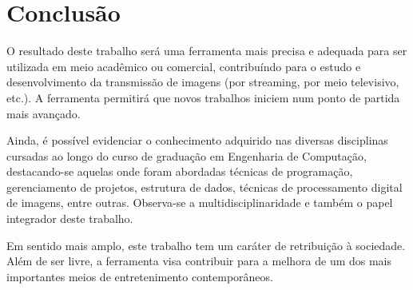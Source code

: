 \chapter{Conclusão}

O resultado deste trabalho será uma ferramenta mais precisa e adequada para ser utilizada em meio acadêmico ou comercial, contribuíndo para o estudo e desenvolvimento da transmissão de imagens (por streaming, por meio televisivo, etc.). A ferramenta permitirá que novos trabalhos iniciem num ponto de partida mais avançado. 

Ainda, é possível evidenciar o conhecimento adquirido nas diversas disciplinas cursadas ao longo do curso de graduação em Engenharia de Computação, destacando-se aquelas onde foram abordadas técnicas de programação, gerenciamento de projetos, estrutura de dados, técnicas de processamento digital de imagens, entre outras. Observa-se a multidisciplinaridade e também o papel integrador deste trabalho.

Em sentido mais amplo, este trabalho tem um caráter de retribuição à sociedade. Além de ser livre, a ferramenta visa contribuir para a melhora de um dos mais importantes meios de entretenimento contemporâneos.
